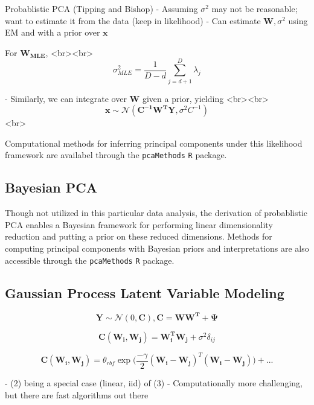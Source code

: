 \documentclass[english, 11pt]{article}\usepackage[]{graphicx}\usepackage[]{color}
\begin{document}
Probablistic PCA (Tipping and Bishop)
- Assuming $\sigma^2$ may not be reasonable; want to estimate it from the data (keep in likelihood)
- Can estimate $\mathbf{W}, \sigma^2$ using EM and with a prior over $\mathbf{x}$

For  $\mathbf{W_{\textrm{MLE}}}$, <br><br> $$\sigma_{MLE}^2 = \frac{1}{D-d} \sum_{j = d +1}^D \lambda_j $$

- Similarly, we can integrate over $\mathbf{W}$ given a prior, yielding <br><br>
$$  \mathbf{x} \sim  \mathcal{N} (\mathbf{C^{-1}W^{T}Y}, \sigma^2C^{-1})$$ <br>


Computational methods for inferring principal components under this likelihood framework are availabel through the \texttt{pcaMethods} \texttt{R} package.

\subsection{Bayesian PCA}
Though not utilized in this particular data analysis, the derivation of probablistic PCA enables a Bayesian framework for performing linear dimensionality reduction and putting a prior on these reduced dimensions. \cite{bishop1999bayesian} Methods for computing principal components with Bayesian priors and interpretations are also accessible through the \texttt{pcaMethods} \texttt{R} package.

\subsection{Gaussian Process Latent Variable Modeling}

\begin{equation}
\mathbf{Y} \sim  \mathcal{N} (0, \mathbf{C}), \mathbf{C} = \mathbf{WW^T }+ \mathbf{\Psi}
\end{equation}

\begin{equation}
\mathbf{C}(\mathbf{W_i},\mathbf{W_j}) = \mathbf{W_i^T}\mathbf{W_j} + \sigma^2\delta_{ij}
\end{equation}

\begin{equation}
\mathbf{C}(\mathbf{W_i},\mathbf{W_j}) = \theta_{rbf} \exp \Big(\frac{-\gamma}{2}(\mathbf{W_i}-\mathbf{W_j})^{T}(\mathbf{W_i}-\mathbf{W_j})  \Big) + ...
\end{equation}


- (2) being a special case (linear, iid) of (3)
- Computationally more challenging, but there are fast algorithms out there
\end{document}
